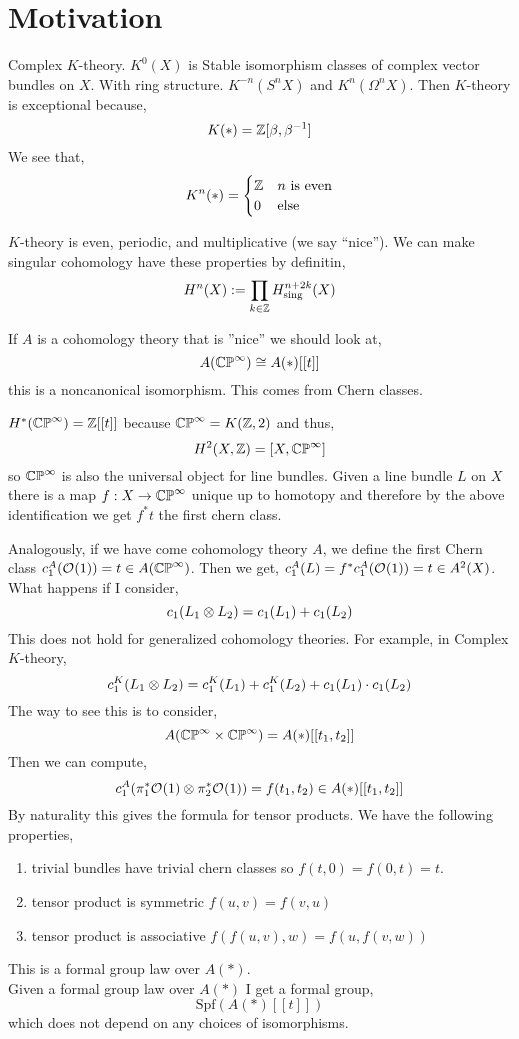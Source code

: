 \documentclass[12pt]{article}
\begin{document}
\section{Motivation}

\begin{example}
Complex $K$-theory. $K^0(X)$ is Stable isomorphism classes of complex vector bundles on $X$. With ring structure. $K^{-n}(S^n X)$ and $K^n(\Omega^n X)$. Then $K$-theory is exceptional because,
\[ K(*) = \mathbb{Z}[\beta, \beta^{-1}] \]
We see that,
\[ K^n(*) = 
\begin{cases}
\mathbb{Z} & n \text{ is even}
\\
0 & \text{else}
\end{cases} \]
\end{example}

$K$-theory is even, periodic, and multiplicative (we say ``nice''). We can make singular cohomology have these properties by definitin,
\[ H^n(X) := \prod_{k \in \mathbb{Z}} H^{n + 2k}_{\text{sing}}(X) \]

If $A$ is a cohomology theory that is ''nice'' we should look at,
\[ A(\mathbb{CP}^\infty) \cong A(*) [[t]] \]
this is a noncanonical isomorphism. This comes from Chern classes.

\begin{example}
$H^*(\mathbb{CP}^\infty) = \mathbb{Z}[[t]]$
because $\mathbb{CP}^\infty = K(\mathbb{Z}, 2)$ and thus,
\[ H^2(X, \mathbb{Z}) = [X, \mathbb{CP}^\infty] \]
so $\mathbb{CP}^\infty$ is also the universal object for line bundles. Given a line bundle $L$ on $X$ there is a map $f : X \to \mathbb{CP}^\infty$ unique up to homotopy and therefore by the above identification we get $f^* t$ the first chern class.
\end{example}

Analogously, if we have come cohomology theory $A$, we define the first Chern class $c_1^A(\mathcal{O}_{}(1)) = t \in A(\mathbb{CP}^\infty)$. Then we get, $c_1^A(L) = f^* c_1^A(\mathcal{O}_{}(1)) = t \in A^2(X)$.  
\bigskip\\
What happens if I consider,
\[ c_1(L_1 \otimes L_2) = c_1(L_1) + c_1(L_2) \]
This does not hold for generalized cohomology theories. For example, in Complex $K$-theory,
\[ c_1^K(L_1 \otimes L_2) = c_1^K(L_1) + c_1^K(L_2) + c_1(L_1) \cdot c_1(L_2) \]
The way to see this is to consider, 
\[ A(\mathbb{CP}^\infty \times \mathbb{CP}^\infty) = A(*)[[t_1, t_2]] \]
Then we can compute,
\[ c_1^A(\pi_1^* \mathcal{O}_{}(1) \otimes \pi_2^* \mathcal{O}_{}(1)) = f(t_1, t_2) \in A(*)[[t_1, t_2]] \]
By naturality this gives the formula for tensor products. We have the following properties,
\begin{enumerate}
\item trivial bundles have trivial chern classes so $f(t,0) = f(0,t) = t$.
\item tensor product is symmetric $f(u,v) = f(v,u)$
\item tensor product is associative $f(f(u,v),w) = f(u, f(v,w))$
\end{enumerate}
This is a formal group law over $A(*)$. 
\bigskip\\
Given a formal group law over $A(*)$ I get a formal group,
\[ \mathrm{Spf}(A(*)[[t]]) \]
which does not depend on any choices of isomorphisms.
\end{document}
